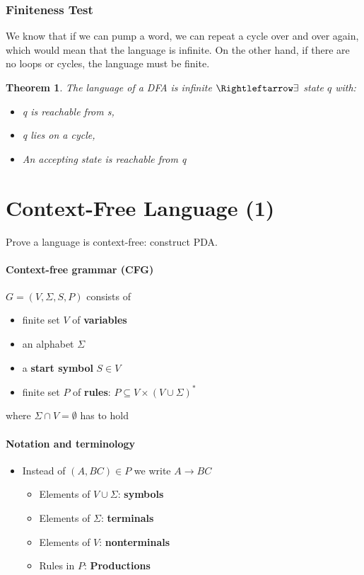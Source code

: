 \documentclass[a3paper, 8pt]{extarticle}
\newtheorem{theorem}{Theorem}[section]
\begin{document}
\begin{multicols*}{6}
\subsubsection{Finiteness Test}
We know that if we can pump a word, we can repeat a cycle over and over again, which would mean that the language is infinite. On the other hand, if there are no loops or cycles, the language must be finite.

\begin{theorem}
    The language of a DFA is infinite $\Rightleftarrow \exists$ state $q$ with:\begin{itemize}
        \item q is reachable from s,
        \item q lies on a cycle,
        \item An accepting state is reachable from q
    \end{itemize}
\end{theorem}
\section{Context-Free Language (1)} 

Prove a language is context-free: construct PDA.
 \paragraph{Context-free grammar (CFG)} $G=(V,\Sigma, S, P)$ consists of  \begin{itemize}
     \item finite set $V$ of \textbf{variables}
     \item an alphabet $\Sigma$
     \item a \textbf{start symbol} $S \in V$
     \item finite set $P$ of \textbf{rules}: $P \subseteq V \times (V \cup \Sigma)^*$
 \end{itemize}
 where $\Sigma \cap V = \emptyset$ has to hold
 
 \paragraph{Notation and terminology} \begin{itemize}
     \item Instead of $(A,BC) \in P$ we write $A \to BC$
 \begin{itemize}
         \item Elements of $V \cup \Sigma$: \textbf{symbols}
         \item Elements of $\Sigma$: \textbf{terminals}
         \item Elements of $V$: \textbf{nonterminals}
         \item Rules in $P$: \textbf{Productions}
     \end{itemize}
 \end{itemize}
 

\end{multicols*}
\end{document}

